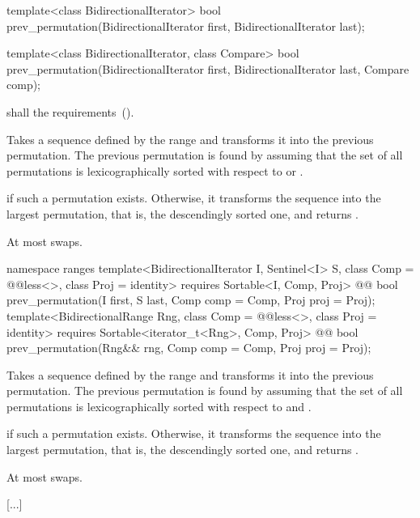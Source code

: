 %
\begin{itemdecl}
template<class BidirectionalIterator>
  bool prev_permutation(BidirectionalIterator first,
                        BidirectionalIterator last);

template<class BidirectionalIterator, class Compare>
  bool prev_permutation(BidirectionalIterator first,
                        BidirectionalIterator last, Compare comp);
\end{itemdecl}

\begin{itemdescr}
\pnum
\requires
{} shall   the
 requirements~().

\pnum
\effects
Takes a sequence defined by the range
and transforms it into the previous permutation.
The previous permutation is found by assuming that the set of all permutations is
lexicographically sorted with respect to
or .

\pnum
\returns
{}
if such a permutation exists.
Otherwise, it transforms the sequence into the largest permutation,
that is, the descendingly sorted one, and returns
.

\pnum
\complexity
At most
swaps.
\end{itemdescr}

\begin{addedblock}
%
\begin{itemdecl}
namespace ranges {
  template<BidirectionalIterator I, Sentinel<I> S, class Comp = @@less<>,
      class Proj = identity>
    requires Sortable<I, Comp, Proj>
    @@ bool
      prev_permutation(I first, S last, Comp comp = Comp{}, Proj proj = Proj{});
  template<BidirectionalRange Rng, class Comp = @@less<>,
      class Proj = identity>
    requires Sortable<iterator_t<Rng>, Comp, Proj>
    @@ bool
      prev_permutation(Rng&& rng, Comp comp = Comp{}, Proj proj = Proj{});
}
\end{itemdecl}

\begin{itemdescr}
\pnum
\effects
Takes a sequence defined by the range
and transforms it into the previous permutation.
The previous permutation is found by assuming that the set of all permutations is
lexicographically sorted with respect to
 and .

\pnum
\returns
{}
if such a permutation exists.
Otherwise, it transforms the sequence into the largest permutation,
that is, the descendingly sorted one, and returns
.

\pnum
\complexity
At most
swaps.
\end{itemdescr}
\end{addedblock}

[...]
